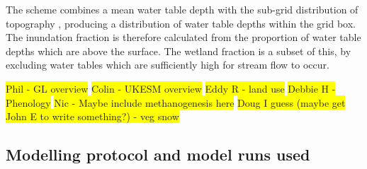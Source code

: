 \documentclass[bg, manuscript]{copernicus}
\newcommand{\hilight}[1]{\colorbox{yellow}{#1}}
\begin{document}
The scheme combines a mean water table depth with the sub-grid distribution of topography \citep{Gedney2019}, producing a distribution of water table depths within the grid box. The inundation fraction is therefore calculated from the proportion of water table depths which are above the surface. The wetland fraction is a subset of this, by excluding water tables which are sufficiently high for stream flow to occur.


\hilight{Phil - GL overview}
\hilight{Colin - UKESM overview}
\hilight{Eddy R - land use}
\hilight{Debbie H - Phenology}
\hilight{Nic - Maybe include methanogenesis here}
\hilight{Doug I guess (maybe get John E to write something?) - veg snow}

\subsection{Modelling protocol and model runs used}
\end{document}
